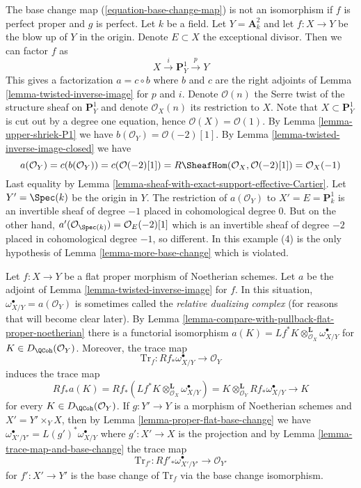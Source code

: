 \begin{example}
\label{example-base-change-wrong}
The base change map (\ref{equation-base-change-map}) is not an
isomorphism if $f$ is perfect proper and $g$ is perfect.
Let $k$ be a field. Let $Y = \mathbf{A}^2_k$ and let $f : X \to Y$
be the blow up of $Y$ in the origin. Denote $E \subset X$ the
exceptional divisor. Then we can factor $f$ as
$$
X \xrightarrow{i} \mathbf{P}^1_Y \xrightarrow{p} Y
$$
This gives a factorization $a = c \circ b$ where
$b$ and $c$ are the right adjoints of
Lemma \ref{lemma-twisted-inverse-image}
for $p$ and $i$. Denote $\mathcal{O}(n)$ the
Serre twist of the structure sheaf on $\mathbf{P}^1_Y$ and
denote $\mathcal{O}_X(n)$ its restriction to $X$.
Note that $X \subset \mathbf{P}^1_Y$ is cut out by
a degree one equation, hence $\mathcal{O}(X) = \mathcal{O}(1)$.
By Lemma \ref{lemma-upper-shriek-P1} we have
$b(\mathcal{O}_Y) = \mathcal{O}(-2)[1]$.
By Lemma \ref{lemma-twisted-inverse-image-closed}
we have
$$
a(\mathcal{O}_Y) = c(b(\mathcal{O}_Y)) =
c(\mathcal{O}(-2)[1]) =
R\SheafHom(\mathcal{O}_X, \mathcal{O}(-2)[1]) =
\mathcal{O}_X(-1)
$$
Last equality by Lemma \ref{lemma-sheaf-with-exact-support-effective-Cartier}.
Let $Y' = \Spec(k)$ be the origin in $Y$. The restriction of
$a(\mathcal{O}_Y)$ to $X' = E = \mathbf{P}^1_k$
is an invertible sheaf of degree $-1$ placed in cohomological
degree $0$. But on the other hand,
$a'(\mathcal{O}_{\Spec(k)}) = \mathcal{O}_E(-2)[1]$
which is an invertible sheaf of degree $-2$ placed in
cohomological degree $-1$, so different. In this example
(4) is the only hypothesis of Lemma \ref{lemma-more-base-change}
which is violated.
\end{example}

\begin{remark}
\label{remark-relative-dualizing-complex}
Let $f : X \to Y$ be a flat proper morphism of Noetherian schemes.
Let $a$ be the adjoint of Lemma \ref{lemma-twisted-inverse-image} for $f$.
In this situation, $\omega_{X/Y}^\bullet = a(\mathcal{O}_Y)$
is sometimes called the {\it relative dualizing complex}
(for reasons that will become clear later). By
Lemma \ref{lemma-compare-with-pullback-flat-proper-noetherian}
there is a functorial isomorphism
$a(K) = Lf^*K \otimes_{\mathcal{O}_X}^\mathbf{L} \omega_{X/Y}^\bullet$
for $K \in D_\QCoh(\mathcal{O}_Y)$. Moreover, the trace map
$$
\text{Tr}_f : Rf_*\omega_{X/Y}^\bullet \to \mathcal{O}_Y
$$
induces the trace map
$$
Rf_*a(K) = Rf_*(Lf^*K \otimes_{\mathcal{O}_X}^\mathbf{L} \omega_{X/Y}^\bullet)
= K \otimes_{\mathcal{O}_Y}^\mathbf{L} Rf_*\omega_{X/Y}^\bullet
\to K
$$
for every $K \in D_\QCoh(\mathcal{O}_Y)$. If $g : Y' \to Y$ is a
morphism of Noetherian schemes and $X' = Y' \times_Y X$, then by
Lemma \ref{lemma-proper-flat-base-change} we have
$\omega_{X'/Y'}^\bullet = L(g')^*\omega_{X/Y}^\bullet$ where $g' : X' \to X$
is the projection and by Lemma \ref{lemma-trace-map-and-base-change}
the trace map
$$
\text{Tr}_{f'} : Rf'_*\omega_{X'/Y'}^\bullet \to \mathcal{O}_{Y'}
$$
for $f' : X' \to Y'$ is the base change of $\text{Tr}_f$ via the
base change isomorphism.
\end{remark}



